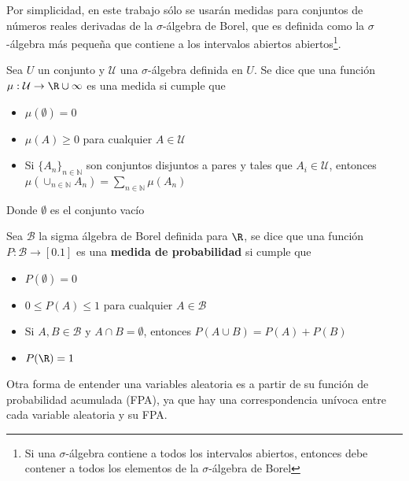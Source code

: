 Por simplicidad, en este trabajo sólo se usarán medidas para conjuntos de números reales derivadas 
de la $\sigma$-álgebra de Borel, que es definida como la $\sigma$-álgebra más pequeña que contiene a 
los intervalos abiertos abiertos\footnote{Si una $\sigma$-álgebra contiene a todos los
intervalos abiertos, entonces debe contener a todos los elementos de la $\sigma$-álgebra de Borel}.

\begin{defn}[Medida]
Sea $U$ un conjunto y $\mathcal{U}$ una $\sigma$-álgebra definida en $U$. Se dice que una función
$\mu : \mathcal{U} \rightarrow \R \cup {\infty}$ es una medida si cumple que
\begin{itemize}
\item $\mu(\emptyset) = 0$
\item $\mu(A) \geq 0$ para cualquier $A \in \mathcal{U}$
\item Si $\{ A_n \}_{n\in \mathbb{N}}$ son conjuntos disjuntos a pares y tales que 
$A_i \in \mathcal{U}$, entonces 
$\displaystyle \mu\left( \cup_{n\in \mathbb{N}} A_n \right) = \sum_{n\in \mathbb{N}} \mu(A_n)$
\end{itemize}
Donde $\emptyset$ es el conjunto vacío %
\end{defn}

\begin{defn}
Sea $\mathcal{B}$ la sigma álgebra de Borel definida para $\R$, se dice que una función
$P : \mathcal{B} \rightarrow [0.1]$ es una \textbf{medida de probabilidad} si cumple que
\begin{itemize}
\item $P(\emptyset) = 0$
\item $0 \leq P(A) \leq 1$ para cualquier $A \in \mathcal{B}$
\item Si $A, B \in \mathcal{B}$ y $A\cap B = \emptyset$, entonces $P(A \cup B) = P(A) + P(B)$ 
\item $P(\R) = 1$
\end{itemize}
\label{variable_aleatoria}
\end{defn}


Otra forma de entender una variables aleatoria es a partir de su función de probabilidad
acumulada (FPA), ya que hay una correspondencia unívoca entre cada variable aleatoria y su FPA.

